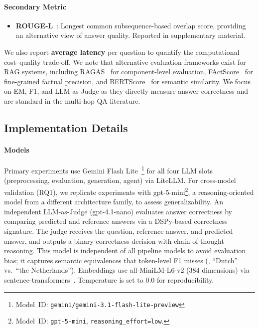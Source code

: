 \paragraph{Secondary Metric}

\begin{itemize}
    \item \textbf{ROUGE-L}~\cite{lin2004rouge}: Longest common subsequence-based overlap score, providing an alternative view of answer quality. Reported in supplementary material.
\end{itemize}

We also report \textbf{average latency} per question to quantify the computational cost--quality trade-off.
We note that alternative evaluation frameworks exist for RAG systems, including RAGAS~\cite{es2024ragas} for component-level evaluation, FActScore~\cite{min2023factscore} for fine-grained factual precision, and BERTScore~\cite{zhang2020bertscore} for semantic similarity.
We focus on EM, F1, and LLM-as-Judge as they directly measure answer correctness and are standard in the multi-hop QA literature.

\subsection{Implementation Details}
\label{subsec:implementation}

\paragraph{Models}
Primary experiments use Gemini Flash Lite~\cite{geminiteam2023gemini}\footnote{Model~ID: \texttt{gemini/gemini-3.1-flash-lite-preview}} for all four LLM slots (preprocessing, evaluation, generation, agent) via LiteLLM.
For cross-model validation (RQ1), we replicate experiments with gpt-5-mini\footnote{Model~ID: \texttt{gpt-5-mini}, \texttt{reasoning\_effort=low}.}, a reasoning-oriented model from a different architecture family, to assess generalizability.
An independent LLM-as-Judge (gpt-4.1-nano) evaluates answer correctness by comparing predicted and reference answers via a DSPy-based correctness signature.
The judge receives the question, reference answer, and predicted answer, and outputs a binary correctness decision with chain-of-thought reasoning.
This model is independent of all pipeline models to avoid evaluation bias; it captures semantic equivalences that token-level F1 misses (\eg, ``Dutch'' vs.\ ``the Netherlands'').
Embeddings use all-MiniLM-L6-v2 (384 dimensions) via sentence-trans\-formers~\cite{reimers2019sentence}.
Temperature is set to 0.0 for reproducibility.

